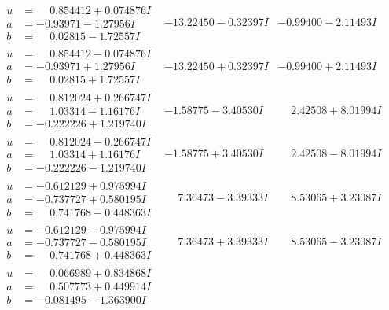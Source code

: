 \documentclass[1p]{elsarticle_modified}
\theoremstyle{definition}
\begin{document}
$$\begin{array}{c|c|c}
\begin{aligned}
u &= \phantom{-}0.854412 + 0.074876 I \\
a &= -0.93971 - 1.27956 I \\
b &= \phantom{-}0.02815 - 1.72557 I\end{aligned}
 & -13.22450 - 0.32397 I & -0.99400 - 2.11493 I \\ \hline\begin{aligned}
u &= \phantom{-}0.854412 - 0.074876 I \\
a &= -0.93971 + 1.27956 I \\
b &= \phantom{-}0.02815 + 1.72557 I\end{aligned}
 & -13.22450 + 0.32397 I & -0.99400 + 2.11493 I \\ \hline\begin{aligned}
u &= \phantom{-}0.812024 + 0.266747 I \\
a &= \phantom{-}1.03314 - 1.16176 I \\
b &= -0.222226 + 1.219740 I\end{aligned}
 & -1.58775 - 3.40530 I & \phantom{-}2.42508 + 8.01994 I \\ \hline\begin{aligned}
u &= \phantom{-}0.812024 - 0.266747 I \\
a &= \phantom{-}1.03314 + 1.16176 I \\
b &= -0.222226 - 1.219740 I\end{aligned}
 & -1.58775 + 3.40530 I & \phantom{-}2.42508 - 8.01994 I \\ \hline\begin{aligned}
u &= -0.612129 + 0.975994 I \\
a &= -0.737727 + 0.580195 I \\
b &= \phantom{-}0.741768 - 0.448363 I\end{aligned}
 & \phantom{-}7.36473 - 3.39333 I & \phantom{-}8.53065 + 3.23087 I \\ \hline\begin{aligned}
u &= -0.612129 - 0.975994 I \\
a &= -0.737727 - 0.580195 I \\
b &= \phantom{-}0.741768 + 0.448363 I\end{aligned}
 & \phantom{-}7.36473 + 3.39333 I & \phantom{-}8.53065 - 3.23087 I \\ \hline\begin{aligned}
u &= \phantom{-}0.066989 + 0.834868 I \\
a &= \phantom{-}0.507773 + 0.449914 I \\
b &= -0.081495 - 1.363900 I\end{aligned}

\end{array}$$
\end{document}
